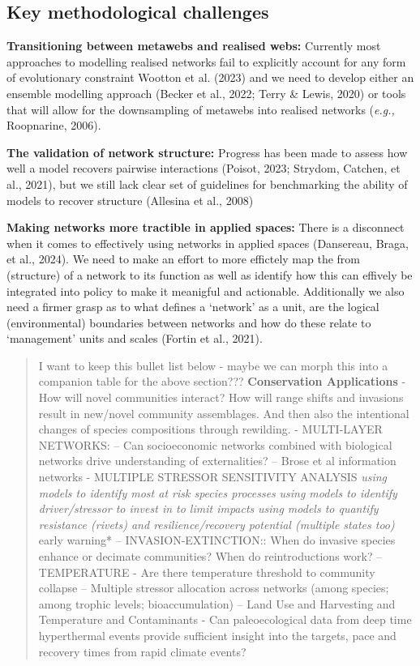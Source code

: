 \documentclass[
]{article}
\begin{document}
\subsection{Key methodological
challenges}\label{key-methodological-challenges}

\textbf{Transitioning between metawebs and realised webs:} Currently
most approaches to modelling realised networks fail to explicitly
account for any form of evolutionary constraint Wootton et al. (2023)
and we need to develop either an ensemble modelling approach (Becker et
al., 2022; Terry \& Lewis, 2020) or tools that will allow for the
downsampling of metawebs into realised networks (\emph{e.g.,}
Roopnarine, 2006).

\textbf{The validation of network structure:} Progress has been made to
assess how well a model recovers pairwise interactions (Poisot, 2023;
Strydom, Catchen, et al., 2021), but we still lack clear set of
guidelines for benchmarking the ability of models to recover structure
(Allesina et al., 2008)

\textbf{Making networks more tractible in applied spaces:} There is a
disconnect when it comes to effectively using networks in applied spaces
(Dansereau, Braga, et al., 2024). We need to make an effort to more
effictely map the from (structure) of a network to its function as well
as identify how this can effively be integrated into policy to make it
meanigful and actionable. Additionally we also need a firmer grasp as to
what defines a `network' as a unit, are the logical (environmental)
boundaries between networks and how do these relate to `management'
units and scales (Fortin et al., 2021).

\begin{quote}
I want to keep this bullet list below - maybe we can morph this into a
companion table for the above section??? \textbf{Conservation
Applications} - How will novel communities interact? How will range
shifts and invasions result in new/novel community assemblages. And then
also the intentional changes of species compositions through rewilding.
- MULTI-LAYER NETWORKS: -- Can socioeconomic networks combined with
biological networks drive understanding of externalities? -- Brose et al
information networks - MULTIPLE STRESSOR SENSITIVITY ANALYSIS
\emph{using models to identify most at risk species processes}
\emph{using models to identify driver/stressor to invest in to limit
impacts} \emph{using models to quantify resistance (rivets) and
resilience/recovery potential (multiple states too) }early warning* --
INVASION-EXTINCTION:: When do invasive species enhance or decimate
communities? When do reintroductions work? -- TEMPERATURE - Are there
temperature threshold to community collapse -- Multiple stressor
allocation across networks (among species; among trophic levels;
bioaccumulation) -- Land Use and Harvesting and Temperature and
Contaminants - Can paleoecological data from deep time hyperthermal
events provide sufficient insight into the targets, pace and recovery
times from rapid climate events?
\end{quote}
\end{document}

